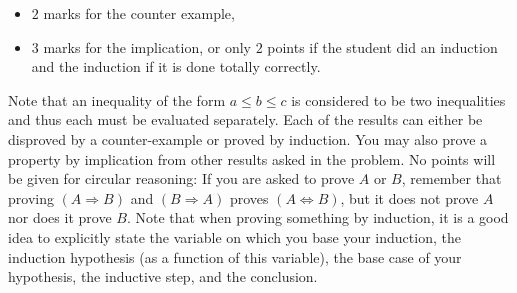 \begin{enumerate}
\begin{solution}
\begin{itemize}
\end{itemize}

\begin{INUTILE}
  \begin{markingScheme}
    \begin{itemize}
    \item $2$ marks for the counter example,
    \item $3$ marks for the implication, or only $2$ points if the
      student did an induction and the induction if it is done totally
      correctly.
    \end{itemize}
  \end{markingScheme}
\end{INUTILE}
\end{solution}






\end{enumerate}


\begin{hint}
  Note that an inequality of the form $a \le b \le c$ is considered to
  be two inequalities and thus each must be evaluated separately.
  Each of the results can either be disproved by a counter-example or
  proved by induction. You may also prove a property by implication
  from other results asked in the problem.
  No points will be given for circular reasoning: If you are asked to
  prove $A$ or $B$, remember that proving $(A\Rightarrow B)$ and
  $(B\Rightarrow A)$ proves $(A\Leftrightarrow B)$, but it does not
  prove $A$ nor does it prove $B$.
  Note that when proving something by induction, it is a good idea to
  explicitly state the variable on which you base your induction, the
  induction hypothesis (as a function of this variable), the base case
  of your hypothesis, the inductive step, and the conclusion.
\end{hint}


